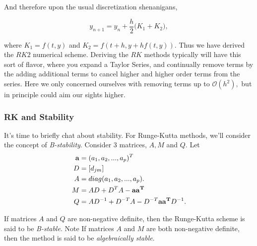 \documentclass[paper=a4, fontsize=11pt]{scrartcl} %
\numberwithin{equation}{section} %
\numberwithin{figure}{section} %
\numberwithin{table}{section} %
\begin{document}
And therefore upon the usual discretization shenanigans,

$$y_{n+1} = y_n + \frac{h}{2} \big( K_1 + K_2 \big),$$

where $K_1 = f(t,y)$ and $K_2 = f(t+h,y+hf(t,y)).$ Thus we have derived the $RK2$ numerical scheme. Deriving the $RK$ methods typically will have this sort of flavor, where you expand a Taylor Series, and continually remove terms by the adding additional terms to cancel higher and higher order terms from the series. Here we only concerned ourselves with removing terms up to $\mathcal{O}(h^2),$ but in principle could aim our sights higher. 

%
%

\subsubsection{RK and Stability}
It's time to briefly chat about stability. For Runge-Kutta methods, we'll consider the concept of \emph{B-stability}. Consider 3 matrices, $A,M$ and $Q$. Let 
\begin{align}
\nonumber
\begin{split}
{\bf{a}} &= (a_1,a_2,...,a_p)^T \\ 
D &= \left[ d_{jm} \right] \\
A &= diag(a_1,a_2,...,a_p). \\ 
M &= AD+ D^TA - {{\bf{aa^T}}} \\
Q &= AD^{-1} +D^{-T} A-D^{-T} {\bf{aa^{T}}} D^{-1}.\\
\end{split}
\end{align}

If matrices $A$ and $Q$ are non-negative definite, then the Runge-Kutta scheme is said to be \emph{B-stable}. Note If matrices $A$ and $M$ are both non-negative definite, then the method is said to be \emph{algebraically stable}.
\end{document}
